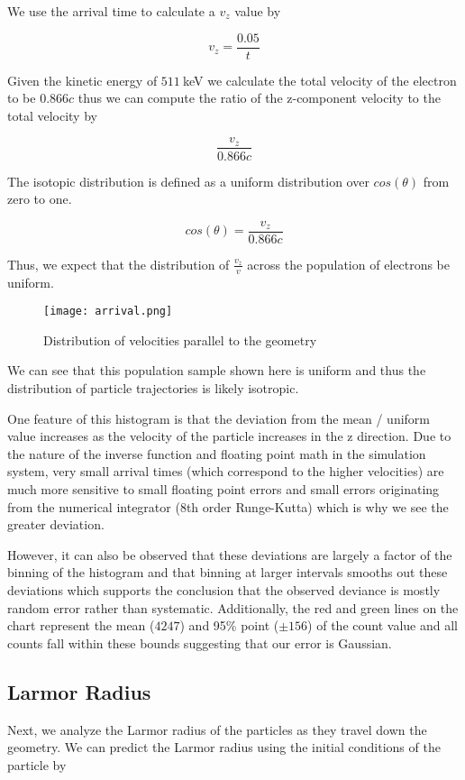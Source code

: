 \documentclass[12pt,letterpaper]{article}
\begin{document}
We use the arrival time to calculate a $v_z$ value by

\[ v_z = \frac{0.05}{t} \]

Given the kinetic energy of $511~$keV we calculate the total velocity of the electron to be $0.866c$ thus we can compute the ratio of the z-component velocity to the total velocity by

\[ \frac{v_z}{0.866c} \]

The isotopic distribution is defined as a uniform distribution over $cos(\theta)$ from zero to one.

\[ cos(\theta) = \frac{v_z}{0.866c} \]

Thus, we expect that the distribution of $\frac{v_z}{v}$ across the population of electrons be uniform.

    \begin{figure}[H]
    \centering
    \texttt{[image: arrival.png]}
    \caption{Distribution of velocities parallel to the geometry}
    \end{figure}
    
We can see that this population sample shown here is uniform and thus the distribution of particle trajectories is likely isotropic. 

One feature of this histogram is that the deviation from the mean / uniform value increases as the velocity of the particle increases in the z direction. Due to the nature of the inverse function and floating point math in the simulation system, very small arrival times (which correspond to the higher velocities) are much more sensitive to small floating point errors and small errors originating from the numerical integrator (8th order Runge-Kutta) which is why we see the greater deviation. 

However, it can also be observed that these deviations are largely a factor of the binning of the histogram and that binning at larger intervals smooths out these deviations which supports the conclusion that the observed deviance is mostly random error rather than systematic. Additionally, the red and green lines on the chart represent the mean ($4247$) and 95\% point ($\pm 156$) of the count value and all counts fall within these bounds suggesting that our error is Gaussian.

\subsection{Larmor Radius}

Next, we analyze the Larmor radius of the particles as they travel down the geometry. We can predict the Larmor radius using the initial conditions of the particle by
\end{document}
